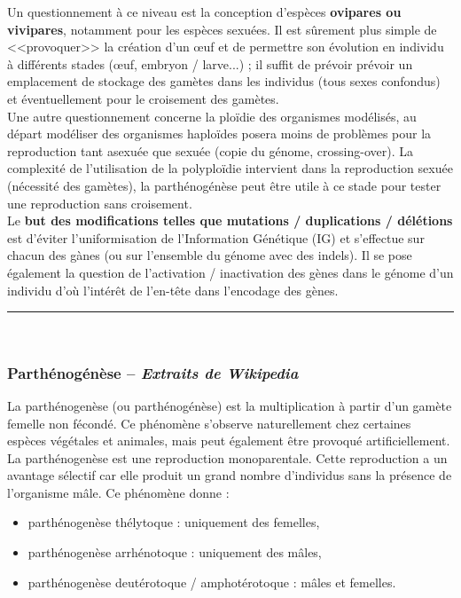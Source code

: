 \documentclass[11pt,twoside,a4paper]{article}
\begin{document}
Un questionnement {\`a} ce niveau est la conception d'esp{\`e}ces \textbf{ovipares ou vivipares}, notamment pour les esp{\`e}ces sexu{\'e}es. Il est s{\^u}rement plus simple de <<provoquer>> la cr{\'e}ation d'un \oe uf et de permettre son {\'e}volution en individu {\`a} diff{\'e}rents stades (\oe uf, embryon / larve...) ; il suffit de pr{\'e}voir pr{\'e}voir un emplacement de stockage des gam{\`e}tes dans les individus (tous sexes confondus) et {\'e}ventuellement pour le croisement des gam{\`e}tes.~\\

Une autre questionnement concerne la plo{\"i}die des organismes mod{\'e}lis{\'e}s, au d{\'e}part mod{\'e}liser des organismes haplo{\"i}des posera moins de probl{\`e}mes pour la reproduction tant asexu{\'e}e que sexu{\'e}e (copie du g{\'e}nome, crossing-over).  La complexit{\'e} de l'utilisation de la polyplo{\"i}die intervient dans la reproduction sexu{\'e}e (n{\'e}cessit{\'e} des gam{\`e}tes), la parth{\'e}nog{\'e}n{\`e}se peut {\^e}tre utile {\`a} ce stade pour tester une reproduction sans croisement.~\\

Le \textbf{but des modifications telles que mutations / duplications / d{\'e}l{\'e}tions} est d'{\'e}viter l'uniformisation de l'Information G{\'e}n{\'e}tique (IG) et s'effectue sur chacun des g{\`a}nes (ou sur l'ensemble du g{\'e}nome avec des indels). Il se pose {\'e}galement la question de l'activation / inactivation des g{\`e}nes dans le g{\'e}nome d'un individu d'o{\`u} l'int{\'e}r{\^e}t de l'en-t{\^e}te dans l'encodage des g{\`e}nes.~\\

\rule{10cm}{0.5mm}~\\

\subsubsection{Parth{\'e}nog{\'e}n{\`e}se -- \emph{Extraits de Wikipedia}~\cite{WikiPathenoGenese}}

La parth{\'e}nogen{\`e}se (ou parth{\'e}nog{\'e}n{\`e}se) est la multiplication {\`a} partir d'un gam{\`e}te femelle non f{\'e}cond{\'e}. Ce ph{\'e}nom{\`e}ne s'observe naturellement chez certaines esp{\`e}ces v{\'e}g{\'e}tales et animales, mais peut {\'e}galement {\^e}tre provoqu{\'e} artificiellement. La parth{\'e}nogen{\`e}se est une reproduction monoparentale. Cette reproduction a un avantage s{\'e}lectif car elle produit un grand nombre d'individus sans la pr{\'e}sence de l'organisme m{\^a}le. Ce ph{\'e}nom{\`e}ne donne :
\begin{itemize}
	\item parth{\'e}nogen{\`e}se th{\'e}lytoque : uniquement des femelles,
	\item parth{\'e}nogen{\`e}se arrh{\'e}notoque : uniquement des m{\^a}les,
	\item parth{\'e}nogen{\`e}se deut{\'e}rotoque / amphot{\'e}rotoque : m{\^a}les et femelles.
\end{itemize}~\\
\end{document}
